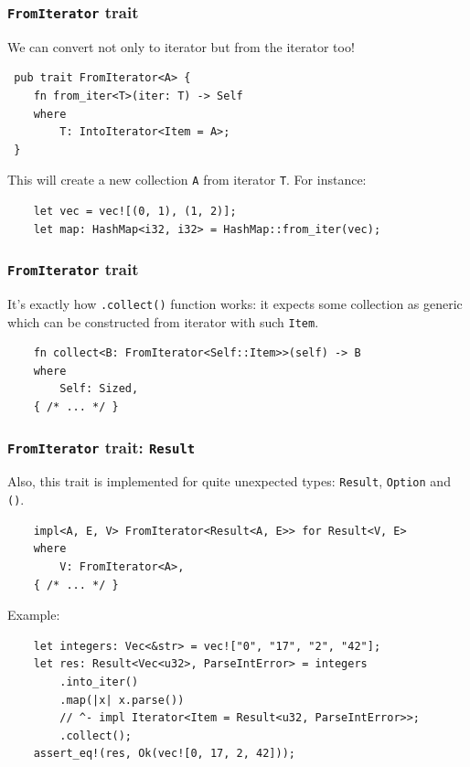 \documentclass[aspectratio=1610,t]{beamer}
\begin{document}
\begin{frame}[fragile]
\frametitle{\texttt{FromIterator} trait}
We can convert not only to iterator but from the iterator too!

\begin{verbatim}
 pub trait FromIterator<A> {
    fn from_iter<T>(iter: T) -> Self
    where
        T: IntoIterator<Item = A>;
 }
\end{verbatim}

This will create a new collection \texttt{A} from iterator \texttt{T}. For instance:

\begin{verbatim}
    let vec = vec![(0, 1), (1, 2)];
    let map: HashMap<i32, i32> = HashMap::from_iter(vec);
\end{verbatim}
\end{frame}


\begin{frame}[fragile]
\frametitle{\texttt{FromIterator} trait}
It's exactly how \texttt{.collect()} function works: it expects some collection as generic which can be constructed from iterator with such \texttt{Item}.

\begin{verbatim}
    fn collect<B: FromIterator<Self::Item>>(self) -> B
    where
        Self: Sized,
    { /* ... */ }
\end{verbatim}
\end{frame}


\begin{frame}[fragile]
\frametitle{\texttt{FromIterator} trait: \texttt{Result}}
Also, this trait is implemented for quite unexpected types: \texttt{Result}, \texttt{Option} and \texttt{()}.

\begin{verbatim}
    impl<A, E, V> FromIterator<Result<A, E>> for Result<V, E>
    where
        V: FromIterator<A>,
    { /* ... */ }
\end{verbatim}

Example:

\begin{verbatim}
    let integers: Vec<&str> = vec!["0", "17", "2", "42"];
    let res: Result<Vec<u32>, ParseIntError> = integers
        .into_iter()
        .map(|x| x.parse())
        // ^- impl Iterator<Item = Result<u32, ParseIntError>>;
        .collect();
    assert_eq!(res, Ok(vec![0, 17, 2, 42]));
\end{verbatim}
\end{frame}
\end{document}
